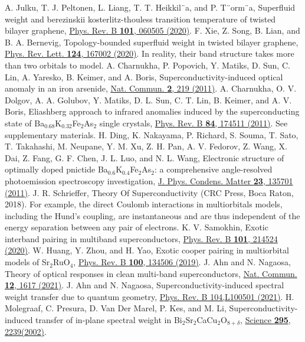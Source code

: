 \documentclass[prl,floatfix,twocolumn,showpacs,amsmath,superscriptaddress]{revtex4-2}
\begin{document}
\begin{thebibliography}{3}
	 A. Julku, T. J. Peltonen, L. Liang, T. T. Heikkil¨a, and P. T¨orm¨a, Superfluid weight and berezinskii kosterlitz-thouless transition temperature of twisted bilayer graphene, \href{https://journals.aps.org/prb/abstract/10.1103/PhysRevB.101.060505}{Phys. Rev. B {\bf 101}, 060505 (2020)}.
	 F. Xie, Z. Song, B. Lian, and B. A. Bernevig, Topology-bounded superfluid weight in twisted bilayer graphene, \href{https://doi.org/10.1103/PhysRevLett.124.167002}{Phys. Rev. Lett. {\bf 124}, 167002 (2020)}.
	 In reality, their band structure takes more than two orbitals to model.
	 A. Charnukha, P. Popovich, Y. Matiks, D. Sun, C. Lin, A. Yaresko, B. Keimer, and A. Boris, Superconductivity-induced optical anomaly in an iron arsenide, \href{https://www.nature.com/articles/ncomms1223}{Nat. Commun. {\bf 2}, 219 (2011)}.
	 A. Charnukha, O. V. Dolgov, A. A. Golubov, Y. Matiks, D. L. Sun, C. T. Lin, B. Keimer, and A. V. Boris, Eliashberg approach to infrared anomalies induced by the superconducting state of Ba$_{0.68}$K$_{0.32}$Fe$_{2}$As$_{2}$ single crystals, \href{https://journals.aps.org/prb/abstract/10.1103/PhysRevB.84.174511}{Phys. Rev. B {\bf 84}, 174511 (2011)}.
	 See supplementary materials.
	 H. Ding, K. Nakayama, P. Richard, S. Souma, T. Sato, T. Takahashi, M. Neupane, Y. M. Xu, Z. H. Pan, A. V. Fedorov, Z. Wang, X. Dai, Z. Fang, G. F. Chen, J. L. Luo, and N. L. Wang, Electronic structure of optimally doped pnictide Ba$_{0.6}$K$_{0.4}$Fe$_2$As$_2$: a comprehensive angle-resolved photoemission spectroscopy investigation, \href{https://iopscience.iop.org/article/10.1088/0953-8984/23/13/135701}{J. Phys. Condens. Matter {\bf 23}, 135701 (2011)}.
	 J. R. Schrieffer, Theory Of Superconductivity (CRC Press, Boca
	Raton, 2018).
	 For example, the direct Coulomb interactions in multiorbitals models, including the Hund’s coupling, are instantaneous and are thus independent of the energy separation between any pair of electrons.
	 K. V. Samokhin, Exotic interband pairing in multiband superconductors, \href{https://journals.aps.org/prb/abstract/10.1103/PhysRevB.101.214524}{Phys. Rev. B {\bf 101}, 214524 (2020)}.
	 W. Huang, Y. Zhou, and H. Yao, Exotic cooper pairing in multiorbital models of Sr$_2$RuO$_4$, \href{https://doi.org/10.1103/PhysRevB.100.134506}{ Phys. Rev. B {\bf 100}, 134506 (2019)}.
	 J. Ahn and N. Nagaosa, Theory of optical responses in clean multi-band superconductors, \href{https://www.nature.com/articles/s41467-021-21905-x}{Nat. Commun. {\bf 12}, 1617 (2021)}.
	 J. Ahn and N. Nagaosa, Superconductivity-induced spectral weight transfer due to quantum geometry, \href{https://journals.aps.org/prb/abstract/10.1103/PhysRevB.104.L100501}{Phys. Rev. B 104,L100501 (2021)}.
	 H. Molegraaf, C. Presura, D. Van Der Marel, P. Kes, and M. Li, Superconductivity-induced transfer of in-plane spectral weight in Bi$_2$Sr$_2$CaCu$_2$O$_{8+\delta}$, \href{https://science.sciencemag.org/content/295/5563/2239}{Science {\bf 295}, 2239(2002)}.
\end{thebibliography}
\newpage
\end{document}
